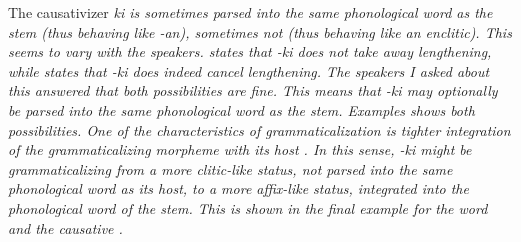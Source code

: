 The causativizer \em ki\ng \em \label{page:phon:king} is sometimes parsed into the same phonological word as the stem (thus behaving like \em -an\em), sometimes not (thus behaving like an enclitic). This seems to vary with the speakers. \citet{Bichsel} states that \em -ki\ng{} \em does not take away lengthening, while \citet{Tapovanaye1995} states that \em -ki\ng{} \em does indeed cancel lengthening. The speakers I asked about this answered that both possibilities are fine. This means that \em -ki\ng{} \em may optionally be parsed into the same phonological word as the stem. Examples  shows both possibilities. One of the characteristics of grammaticalization is tighter integration of the grammaticalizing morpheme with its host \citep[140ff]{HopperTraugott2003}. In this sense, \em -ki\ng{} \em might be grammaticalizing from a more clitic-like status, not parsed into the same phonological word as its host, to a more affix-like status, integrated into the phonological word of the stem. This is shown in the final example for the word  and the causative .
\ea\label{ex:phon:rep:thiithiking}
